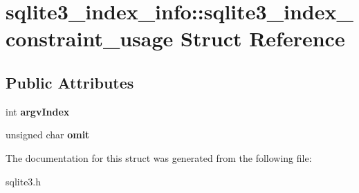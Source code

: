 \hypertarget{structsqlite3__index__info_1_1sqlite3__index__constraint__usage}{}\section{sqlite3\+\_\+index\+\_\+info\+:\+:sqlite3\+\_\+index\+\_\+constraint\+\_\+usage Struct Reference}
\label{structsqlite3__index__info_1_1sqlite3__index__constraint__usage}
\subsection*{Public Attributes}
\begin{DoxyCompactItemize}
\item 
\mbox{\label{structsqlite3__index__info_1_1sqlite3__index__constraint__usage_a2cbf680033c2937b3de226e091743a94}} 
int {\bfseries argv\+Index}
\item 
\mbox{\label{structsqlite3__index__info_1_1sqlite3__index__constraint__usage_ad07fa17d30e4fb3abe23ceaf84edf0ef}} 
unsigned char {\bfseries omit}
\end{DoxyCompactItemize}


The documentation for this struct was generated from the following file\+:\begin{DoxyCompactItemize}
\item 
sqlite3.\+h\end{DoxyCompactItemize}
